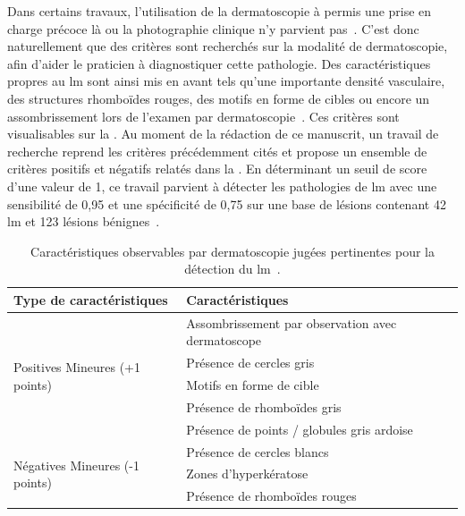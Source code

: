 Dans certains travaux, l'utilisation de la dermatoscopie à permis une prise en charge précoce là ou la photographie clinique n'y parvient pas~\cite{Stante2005}. C'est donc naturellement que des critères sont recherchés sur la modalité de dermatoscopie, afin d'aider le praticien à diagnostiquer cette pathologie. Des caractéristiques propres au \gls{lm} sont ainsi mis en avant tels qu'une importante densité vasculaire, des structures rhomboïdes rouges, des motifs en forme de cibles ou encore un assombrissement lors de l'examen par dermatoscopie~\cite{Pralong2012}. Ces critères sont visualisables sur la . Au moment de la rédaction de ce manuscrit, un travail de recherche reprend les critères précédemment cités et propose un ensemble de critères positifs et négatifs relatés dans la . En déterminant un seuil de score d'une valeur de 1, ce travail parvient à détecter les pathologies de \gls{lm} avec une sensibilité de 0,95 et une spécificité de 0,75 sur une base de lésions contenant 42 \gls{lm} et 123 lésions bénignes~\cite{Ozbagcivan2019}.\par

\begin{table}[H]
    \centering
    \begin{tabular}{ll}
        \toprule
        Type de caractéristiques                        & Caractéristiques                                              \\\hline
        \multirow{5}{*}{Positives Mineures (+1 points)} & Assombrissement par observation avec dermatoscope             \\\cline{2-2}
                                                        & Présence de cercles gris                                      \\\cline{2-2}
                                                        & Motifs en forme de cible                                      \\\cline{2-2}
                                                        & Présence de rhomboïdes gris                                   \\\cline{2-2}
                                                        & Présence de points / globules gris ardoise                    \\\midrule
        \multirow{3}{*}{Négatives Mineures (-1 points)} & Présence de cercles blancs                                    \\\cline{2-2}
                                                        & Zones d'hyperkératose                                         \\\cline{2-2}
                                                        & Présence de rhomboïdes rouges                                 \\\bottomrule
    \end{tabular}
    \caption{Caractéristiques observables par dermatoscopie jugées pertinentes pour la détection du \gls{lm}~\cite{Ozbagcivan2019}.}
    \label{tab:dermoscopy_algorithm_lentigo}
\end{table}\par

